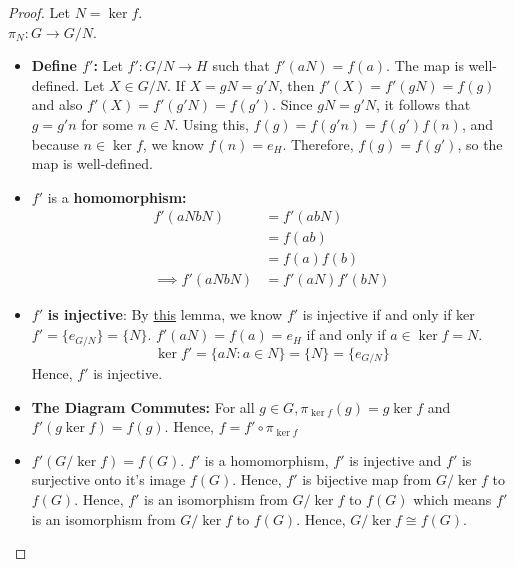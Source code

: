 \begin{proof}
    Let $N = \ker f$.\\
    $\pi_N: G \rightarrow G/N$.
    \begin{itemize}[label={}]
        \item \textbf{Define $f'$:} Let $f': G/N \rightarrow H$ such that $f'(aN) = f(a).$ The map is well-defined. Let $X \in G/N$. If $X = gN = g'N$, then $f'(X) = f'(gN) = f(g)$ and also $f'(X) = f'(g'N) = f(g')$. Since $gN = g'N$, it follows that $g = g'n$ for some $n \in N$. Using this, $f(g) = f(g'n) = f(g')f(n)$, and because $n \in \ker f$, we know $f(n) = e_H$. Therefore, $f(g) = f(g')$, so the map is well-defined.
        \item $f'$ is a \textbf{homomorphism:}
        \begin{align*}
            f'(aNbN) &= f'(abN)\\
                     &= f(ab)\\
                     &= f(a)f(b)\\
            \implies f'(aNbN) &= f'(aN) f'(bN)
        \end{align*}
        \item $f'$ \textbf{is injective}: By \hyperref[def:injectivehomo]{this} lemma, we know $f'$ is injective if and only if ker $f' = \{e_{G/N}\} = \{N\}.$ $f'(aN) = f(a) = e_H$ if and only if $a \in \ker f = N$.
        $$\ker f' = \{aN: a\in N\} = \{N\} = \{e_{G/N}\} $$
        Hence, $f'$ is injective.
        \item \textbf{The Diagram Commutes:} For all $g \in G, \pi_{\ker f}(g) = g \ker f$ and $f'(g \ker f) = f(g)$. Hence, $f = f' \circ \pi_{\ker f}$
        \item $f'(G/\ker f) = f(G)$. $f'$ is a homomorphism, $f'$ is injective and $f'$ is surjective onto it's image $f(G)$. Hence, $f'$ is bijective map from $G/\ker f$ to $f(G)$. Hence, $f'$ is an isomorphism from $G/\ker f$ to $f(G)$ which means $f'$ is an isomorphism from $G/\ker f$ to $f(G)$.
        Hence, $G/\ker f \cong f(G)$.
    \end{itemize}
\end{proof}